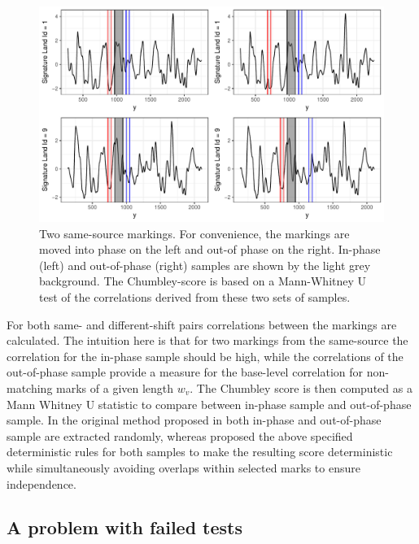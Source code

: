\documentclass[12pt]{article}
\begin{document}
\begin{figure}

{\centering \includegraphics[width=\textwidth]{figures/win-comparison-1} 

}

\caption{Two same-source markings. For convenience, the markings are moved into phase on the left and out-of phase on the right. In-phase (left) and out-of-phase (right) samples are shown by the light grey background. The Chumbley-score is based on a Mann-Whitney U test of the correlations derived from these two sets of samples.}\label{fig:win-comparison}
\end{figure}

For both same- and different-shift pairs correlations between the
markings are calculated. The intuition here is that for two markings
from the same-source the correlation for the in-phase sample should be
high, while the correlations of the out-of-phase sample provide a
measure for the base-level correlation for non-matching marks of a given
length \(w_v\). The Chumbley score is then computed as a Mann Whitney U
statistic to compare between in-phase sample and out-of-phase sample. In
the original method proposed in \citet{chumbley} both in-phase and
out-of-phase sample are extracted randomly, whereas \citet{hadler}
proposed the above specified deterministic rules for both samples to
make the resulting score deterministic while simultaneously avoiding
overlaps within selected marks to ensure independence.

\hypertarget{a-problem-with-failed-tests}{%
\subsection{A problem with failed
tests}\label{a-problem-with-failed-tests}}
\end{document}
